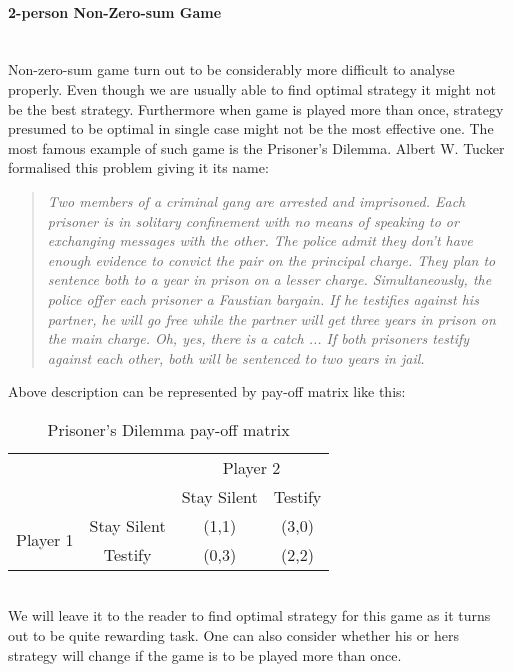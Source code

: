 \documentclass[10pt, a4paper]{report}
\begin{document}
\paragraph{2-person Non-Zero-sum Game} ~\\
Non-zero-sum game turn out to be considerably more difficult to analyse properly. Even though we are usually able to find optimal strategy it might not be the best strategy. Furthermore when game is played more than once, strategy presumed to be optimal in single case might not be the most effective one. The most famous example of such game is the Prisoner's Dilemma. Albert W. Tucker formalised this problem giving it its name:
\begin{quotation}
\textit{
    Two members of a criminal gang are arrested and imprisoned. Each prisoner is in solitary confinement with no means of speaking to or exchanging messages with the other. The police admit they don't have enough evidence to convict the pair on the principal charge. They plan to sentence both to a year in prison on a lesser charge. Simultaneously, the police offer each prisoner a Faustian bargain. If he testifies against his partner, he will go free while the partner will get three years in prison on the main charge. Oh, yes, there is a catch ... If both prisoners testify against each other, both will be sentenced to two years in jail.}
    \end{quotation}
Above description can be represented by pay-off matrix like this:
\begin{table}[ht!]
	\hspace{-2em}
	\centering
	\begin{tabular}{cccc|}
		& & \multicolumn{2}{c}{Player 2}                                              \\ \cline{3-4}
		& & Stay Silent &  \multicolumn{1}{c}{Testify}                                \\ \cline{3-4}
		\multirow{2}{*}{Player 1} & \multicolumn{1}{|c|}{Stay Silent} & (1,1) & (3,0) \\
		& \multicolumn{1}{|c|}{Testify} & (0,3) & (2,2)                               \\ \cline{3-4}
	\end{tabular}
	\caption{Prisoner's Dilemma pay-off matrix}
\end{table}
\\
We will leave it to the reader to find optimal strategy for this game as it turns out to be quite rewarding task. One can also consider whether his or hers strategy will change if the game is to be played more than once.
\end{document}
